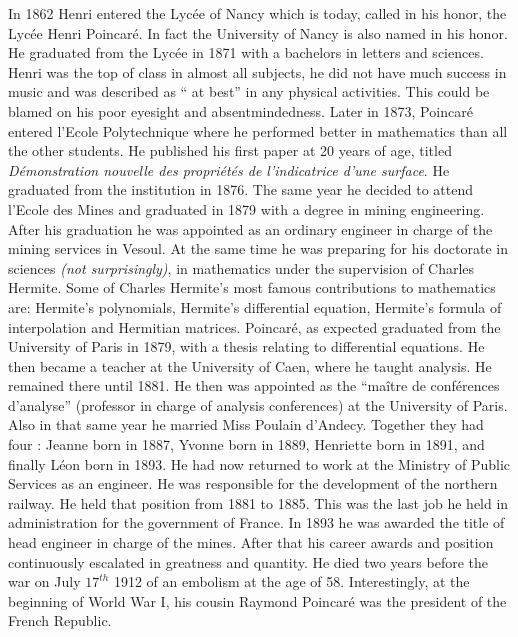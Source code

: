 \documentclass[12pt]{article}
\begin{document}
In 1862 Henri entered the Lyc\'ee of Nancy which is today, called in his honor, the Lyc\'ee Henri Poincar\'e. In fact the University of Nancy is also named in his honor.  He graduated from the Lyc\'ee in 1871 with a bachelors  in letters and sciences.  Henri was the top of class in almost all subjects, he did not have much success in music and was described as `` at best'' in any physical activities.\cite{MT}  This could be blamed on his poor eyesight and absentmindedness.\cite{BC}  Later in 1873, Poincar\'e entered l'Ecole Polytechnique where he performed better in mathematics than all the other students. He published his first paper at 20 years of age, titled \emph{D\'emonstration nouvelle des propri\'et\'es de l'indicatrice d'une surface}.\cite{BR}  He graduated from the institution in 1876.  The same year he decided to attend l'Ecole des Mines and graduated in 1879 with a degree in mining engineering.\cite{SJ}  After his graduation he was appointed as an ordinary engineer in charge of the mining services in Vesoul.  At the same time he was preparing for his doctorate in sciences \textsl{(not surprisingly)}, in mathematics under the supervision of Charles Hermite. Some of Charles Hermite's most famous contributions to mathematics are:  Hermite's polynomials, Hermite's differential equation, Hermite's formula of interpolation and Hermitian matrices.\cite{MT}  Poincar\'e, as expected graduated from the University of Paris in 1879, with a thesis relating to differential equations.  He then became a teacher at the University of Caen, where he taught analysis.  He remained there until 1881. He then was appointed as the ``ma\^itre de conf\'erences d'analyse''\cite{SJ} (professor in charge of analysis conferences) at the University of Paris.  Also in that same year he married Miss Poulain d'Andecy.  Together they had four : Jeanne born in 1887, Yvonne born in 1889, Henriette born in 1891, and finally L\'eon born in 1893.  He had now returned to work at the Ministry of Public Services as an engineer. He was responsible for the development of the northern railway. He held that position from 1881 to 1885. This was the last job he held in administration for the government of France. In 1893 he was awarded the title of head engineer in charge of the mines.  After that his career awards and position continuously escalated in greatness and quantity.  He died two years before the war on July $17^{th}$ 1912 of an embolism at the age of 58.  Interestingly, at the beginning of World War I, his cousin Raymond Poincar\'e was the president of the French Republic.
\end{document}

